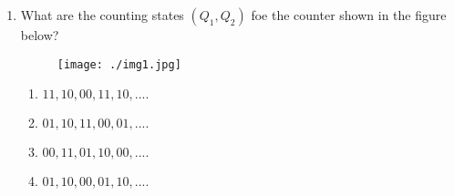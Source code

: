 \documentclass{article}
\begin{document}
                                   
\begin{enumerate}
\item What are the counting states $(Q_{1},Q_{2})$ foe the counter shown in the figure below?
	\begin{figure}[!ht] \texttt{[image: ./img1.jpg]}
			   \end{figure}

		\begin{enumerate}
		   \item $ 11, 10, 00, 11, 10,....$
		   \item $ 01, 10, 11, 00, 01,....$
		   \item $ 00, 11, 01, 10, 00,....$
		   \item $ 01, 10, 00, 01, 10,....$
		\end{enumerate}
\end{enumerate}
\end{document}
